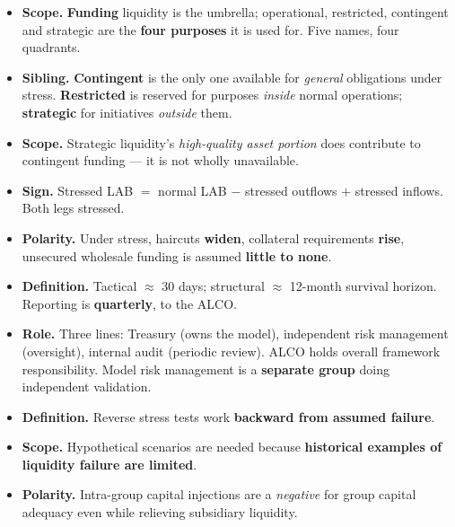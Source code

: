 \begin{lrtrapbox}
\begin{itemize}
\item \textbf{Scope.} \textbf{Funding} liquidity is the umbrella; operational, restricted, contingent and strategic are the \textbf{four purposes} it is used for. Five names, four quadrants.
\item \textbf{Sibling.} \textbf{Contingent} is the only one available for \emph{general} obligations under stress. \textbf{Restricted} is reserved for purposes \emph{inside} normal operations; \textbf{strategic} for initiatives \emph{outside} them.
\item \textbf{Scope.} Strategic liquidity's \emph{high-quality asset portion} does contribute to contingent funding — it is not wholly unavailable.
\item \textbf{Sign.} Stressed LAB $=$ normal LAB $-$ stressed outflows $+$ stressed inflows. Both legs stressed.
\item \textbf{Polarity.} Under stress, haircuts \textbf{widen}, collateral requirements \textbf{rise}, unsecured wholesale funding is assumed \textbf{little to none}.
\item \textbf{Definition.} Tactical $\approx$ 30 days; structural $\approx$ 12-month survival horizon. Reporting is \textbf{quarterly}, to the ALCO.
\item \textbf{Role.} Three lines: Treasury (owns the model), independent risk management (oversight), internal audit (periodic review). ALCO holds overall framework responsibility. Model risk management is a \textbf{separate group} doing independent validation.
\item \textbf{Definition.} Reverse stress tests work \textbf{backward from assumed failure}.
\item \textbf{Scope.} Hypothetical scenarios are needed because \textbf{historical examples of liquidity failure are limited}.
\item \textbf{Polarity.} Intra-group capital injections are a \emph{negative} for group capital adequacy even while relieving subsidiary liquidity.
\end{itemize}
\end{lrtrapbox}
